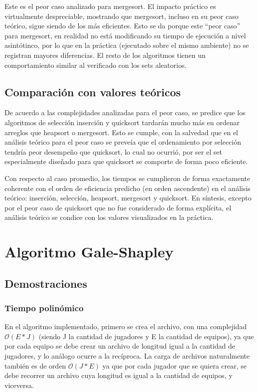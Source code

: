 \documentclass[article,a4paper]{article}
\newcommand{\bigO}{\mathcal{O}}
\begin{document}
Este es el peor caso analizado para mergesort. El impacto práctico es virtualmente despreciable, mostrando que mergesort, incluso en su peor caso teórico, sigue siendo de los más eficientes. Esto se da porque este “peor caso” para mergesort, en realidad no está modificando su tiempo de ejecución a nivel asintótinco, por lo que en la práctica (ejecutado sobre el mismo ambiente) no se registran mayores diferencias. El resto de los algoritmos tienen un comportamiento similar al verificado con los sets aleatorios.

\subsection{Comparación con valores teóricos}

De acuerdo a las complejidades analizadas para el peor caso, se predice que los algoritmos de selección inserción y quicksort tardarán mucho más en ordenar arreglos que heapsort o mergesort. Esto se cumple, con la salvedad que en el análisis teórico para el peor caso se preveía que el ordenamiento por selección tendría peor desempeño que quicksort, lo cual no ocurrió, por ser el set especialmente diseñado para que quicksort se comporte de forma poco eficiente.

Con respecto al caso promedio, los tiempos se cumplieron de forma exactamente coherente con el orden de eficiencia predicho (en orden ascendente) en el análisis teórico: inserción, selección, heapsort, mergesort y quicksort. En síntesis, excepto por el peor caso de quicksort que no fue considerado de forma explícita, el análisis teórico se condice con los valores visualizados en la práctica.

\section{Algoritmo Gale-Shapley}

\subsection{Demostraciones}

\subsubsection{Tiempo polinómico}

En el algoritmo implementado, primero se crea el archivo, con una complejidad $\bigO(E*J)$ (siendo J la cantidad de jugadores y E la cantidad de equipos), ya que por cada equipo se debe crear un archivo de longitud igual a la cantidad de jugadores, y lo análogo ocurre a la recíproca. La carga de archivos  naturalmente también es de orden $\bigO(J*E)$ ya que por cada jugador que se quiera crear, se debe recorrer un archivo cuya longitud es igual a la cantidad de equipos, y viceversa.
\end{document}

